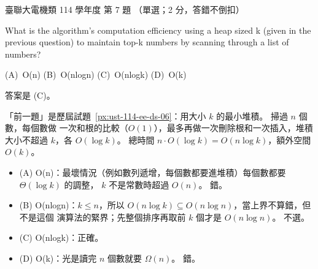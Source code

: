 \begin{pastexam}[label={px:ust-114-ee-ds-07}]{臺聯大電機類 114 學年度 第 7 題}
（單選；2 分，答錯不倒扣）

What is the algorithm's computation efficiency using a heap sized k (given in the previous question)
to maintain top-k numbers by scanning through a list of numbers?

(A)~O(n) \qquad (B)~O(nlogn) \qquad (C)~O(nlogk) \qquad (D)~O(k)
\end{pastexam}

\begin{pastsoln}
答案是 (C)。

「前一題」是歷屆試題~\ref{px:ust-114-ee-ds-06}：用大小 $k$ 的最小堆積。 掃過 $n$ 個數，每個數做
一次和根的比較（$O(1)$），最多再做一次刪除根和一次插入，堆積大小不超過 $k$，各 $O(\log k)$。
總時間 $n \cdot O(\log k) = O(n \log k)$，額外空間 $O(k)$。
\begin{itemize}
\item (A) O(n)：最壞情況（例如數列遞增，每個數都要進堆積）每個數都要 $\Theta(\log k)$ 的調整，
$k$ 不是常數時超過 $O(n)$。 錯。
\item (B) O(nlogn)：$k \le n$，所以 $O(n \log k) \subseteq O(n \log n)$，當上界不算錯，但不是這個
演算法的緊界；先整個排序再取前 $k$ 個才是 $O(n \log n)$。 不選。
\item (C) O(nlogk)：正確。
\item (D) O(k)：光是讀完 $n$ 個數就要 $\Omega(n)$。 錯。
\end{itemize}
\end{pastsoln}
